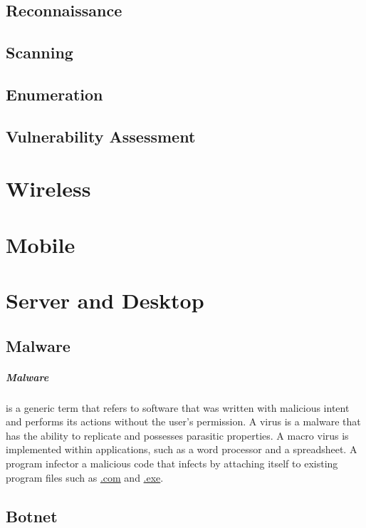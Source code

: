 \documentclass[7x9]{times}
\begin{document}
\section{Reconnaissance}
\section{Scanning}
\section{Enumeration}
\section{Vulnerability Assessment}

\chapter{Wireless}



\chapter{Mobile}

\chapter{Server and Desktop}


\section{Malware}

\paragraph{Malware} is a generic term that refers to
software that was written with malicious intent and performs
its actions without the user's permission. A virus is a
malware that has the ability to replicate and possesses
parasitic properties. A macro virus is implemented within
applications, such as a word processor and a spreadsheet. A
program infector a malicious code that infects by attaching
itself to existing program files such as \url{.com} and
\url{.exe}.

\section{Botnet}
\end{document}
